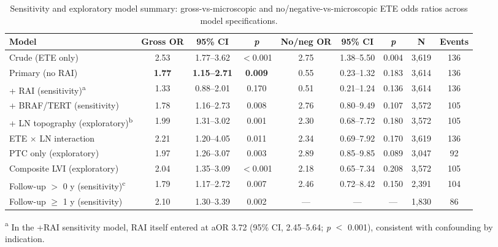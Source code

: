 \begin{landscape}
\begin{table}[htbp]
\centering
\scriptsize
\caption{Sensitivity and exploratory model summary: gross-vs-microscopic and no/negative-vs-microscopic ETE odds ratios across model specifications.}
\label{tab:sensitivity}
\begin{threeparttable}
\begin{tabular}{@{}lcccccccc@{}}
\toprule
\textbf{Model} & \textbf{Gross OR} & \textbf{95\% CI} & \textbf{\textit{p}} & \textbf{No/neg OR} & \textbf{95\% CI} & \textbf{\textit{p}} & \textbf{N} & \textbf{Events} \\
\midrule
Crude (ETE only) & 2.53 & 1.77--3.62 & $<$0.001 & 2.75 & 1.38--5.50 & 0.004 & 3{,}619 & 136 \\
Primary (no RAI) & \textbf{1.77} & \textbf{1.15--2.71} & \textbf{0.009} & 0.55 & 0.23--1.32 & 0.183 & 3{,}614 & 136 \\
+ RAI (sensitivity)\textsuperscript{a} & 1.33 & 0.88--2.01 & 0.170 & 0.51 & 0.21--1.24 & 0.136 & 3{,}614 & 136 \\
+ BRAF/TERT (sensitivity) & 1.78 & 1.16--2.73 & 0.008 & 2.76 & 0.80--9.49 & 0.107 & 3{,}572 & 105 \\ %
+ LN topography (exploratory)\textsuperscript{b} & 1.99 & 1.31--3.02 & 0.001 & 2.30 & 0.68--7.72 & 0.180 & 3{,}572 & 105 \\ %
ETE $\times$ LN interaction & 2.21 & 1.20--4.05 & 0.011 & 2.34 & 0.69--7.92 & 0.170 & 3{,}619 & 136 \\
PTC only (exploratory) & 1.97 & 1.26--3.07 & 0.003 & 2.89 & 0.85--9.85 & 0.089 & 3{,}047 & 92 \\
Composite LVI (exploratory) & 2.04 & 1.35--3.09 & $<$0.001 & 2.18 & 0.65--7.34 & 0.208 & 3{,}572 & 105 \\
Follow-up $>$ 0 y (sensitivity)\textsuperscript{c} & 1.79 & 1.17--2.72 & 0.007 & 2.46 & 0.72--8.42 & 0.150 & 2{,}391 & 104 \\
Follow-up $\geq$ 1 y (sensitivity) & 2.10 & 1.30--3.39 & 0.002 & --- & --- & --- & 1{,}830 & 86 \\
\bottomrule
\end{tabular}
\begin{tablenotes}
\scriptsize
\item[\textsuperscript{a}] In the +RAI sensitivity model, RAI itself entered at aOR 3.72 (95\% CI, 2.45--5.64; \textit{p} $<$ 0.001), consistent with confounding by indication.

\end{tablenotes}
\end{threeparttable}
\end{table}
\end{landscape}
